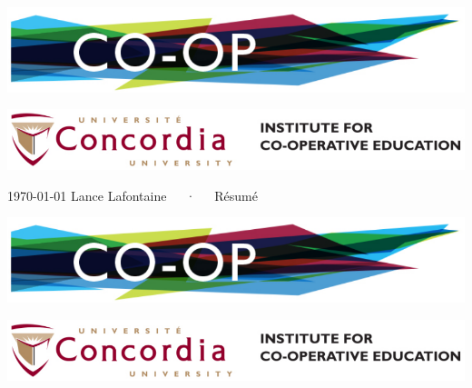 \documentclass[11pt, a4paper]{awesome-cv}
\begin{document}
\includegraphics[scale=0.22]{coop-left}

\vspace{-10.5mm}

\hfill
\includegraphics[scale=0.18]{coop-right}

\vspace{-7mm}

\makecvheader[C]

\makecvfooter
  {\today}
  {Lance Lafontaine~~~·~~~Résumé}
  {\thepage}


%



\newpage

\includegraphics[scale=0.22]{coop-left}

\vspace{-10.5mm}

\hfill
\includegraphics[scale=0.18]{coop-right}

\vspace{-9mm}


\vspace{2mm}

\vspace{2mm}



\end{document}
